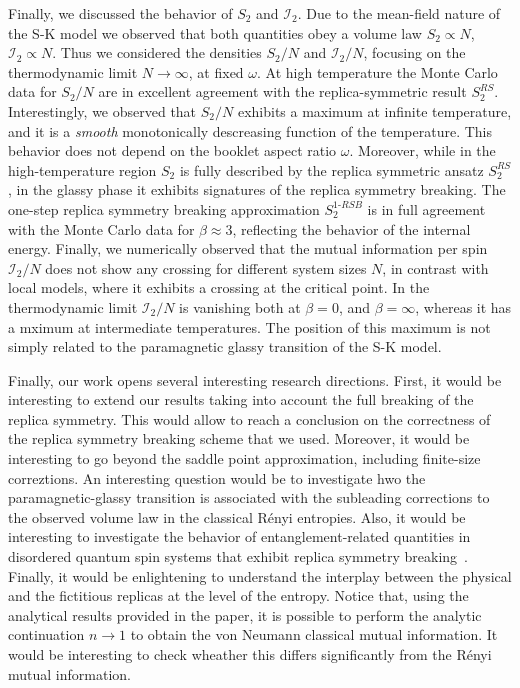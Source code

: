 \documentclass[twocolumn,superscriptaddress,prb,10pt]{revtex4-1}
\begin{document}
Finally, we discussed the behavior of $S_2$ and ${\mathcal I}_2$. Due to the mean-field 
nature of the S-K model we observed that both quantities obey a volume law $S_2\propto N$, 
${\mathcal I}_2\propto N$. Thus we considered the densities $S_2/N$ and ${\mathcal I}_2/N$, 
focusing on the thermodynamic limit $N\to\infty$, at fixed $\omega$. 
At high temperature the Monte Carlo data for $S_2/N$ are in excellent agreement with the 
replica-symmetric result $S_2^{RS}$. Interestingly, we observed that $S_2/N$ exhibits a 
maximum at infinite temperature, and it is a \emph{smooth} monotonically descreasing 
function of the temperature. This behavior does not depend on the booklet aspect ratio 
$\omega$.  Moreover, while in the high-temperature region $S_2$ is fully described by 
the replica symmetric ansatz $S_2^{RS}$, in the glassy phase it exhibits signatures of 
the replica symmetry breaking. The one-step replica symmetry breaking approximation 
$S_2^{1\textrm{-}RSB}$ is in full agreement with the Monte Carlo data for $\beta\approx 3$, 
reflecting the behavior of the internal energy. Finally, we numerically observed that the 
mutual information per spin ${\mathcal I}_2/N$ does not show any crossing for different 
system sizes $N$, in contrast with local models, where it exhibits a crossing at 
the critical point. In the thermodynamic limit ${\mathcal I}_2/N$ is vanishing both 
at $\beta=0$, and $\beta=\infty$, whereas it has a mximum at intermediate temperatures. 
The position of this maximum is not  simply related to the paramagnetic glassy transition 
of the S-K model. 

Finally, our work opens several interesting research directions. First, it would be 
interesting to extend our results taking into account the full breaking of the replica 
symmetry. This would allow to reach a conclusion on the correctness of the replica symmetry 
breaking scheme that we used. Moreover, it would be interesting to go beyond the saddle 
point approximation, including finite-size correztions. An interesting question would be 
to investigate hwo the paramagnetic-glassy transition is associated with the subleading 
corrections to the observed volume law in the classical R\'enyi entropies. Also, it 
would be interesting to investigate the behavior of entanglement-related quantities in 
disordered quantum spin systems that exhibit replica symmetry breaking~\cite{read-1995, 
andreanov-2012}. Finally, it would be enlightening to understand the interplay between 
the physical and the fictitious replicas at the level of the entropy. Notice that,  
using the analytical results provided in the paper, it is possible to perform the 
analytic continuation $n\to 1$ to obtain the von Neumann classical mutual information. 
It would be interesting to check wheather this differs significantly from the 
R\'enyi mutual information. 
\end{document}
